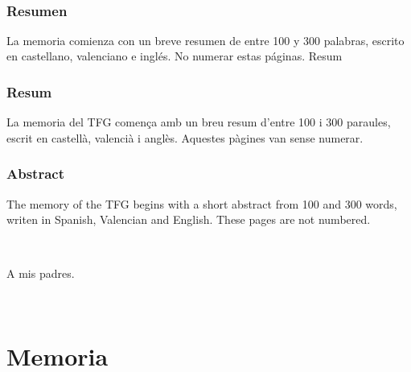 \documentclass[11pt,spanish,a4paper,hidelinks]{book}
\begin{document}
	\renewcommand{\listtablename}{Índice de tablas} 
	\renewcommand{\tablename}{Tabla} 
	\thispagestyle{empty}
	
	\newpage
	\thispagestyle{empty}\ \\
	\newpage
	\thispagestyle{empty}
	
	\section*{Resumen}
	\noindent La memoria comienza con un breve resumen de entre 
	100 y 300
	palabras, escrito en castellano,
	valenciano e inglés. No numerar estas páginas.
	Resum
	
	
	\section*{Resum}
	\noindent La memoria del TFG comença amb un breu resum d’entre 
	100 i 300
	paraules, escrit en castellà, valencià i anglès. Aquestes pàgines van sense numerar.
	
	
	\section*{Abstract}
	\noindent The memory of the TFG begins with a short abstract from 
	100 and 300
	words, writen in Spanish, Valencian and English. These pages are not numbered.
	
	\newpage
	\thispagestyle{empty}
	\ \\
	\vfill\begin{flushright}
		A mis padres.
	\end{flushright}\vfill\vfill
	
	\newpage
	\thispagestyle{empty}
	\ \\
	\tableofcontents\newpage\thispagestyle{empty}
	\listoffigures\thispagestyle{empty}\newpage\thispagestyle{empty}
	\listoftables\thispagestyle{empty}\newpage\thispagestyle{empty}
	\newpage\thispagestyle{empty}
	
	\thispagestyle{empty}
	\setcounter{page}{-2}
	\newpage
	\part{Memoria}
	
\end{document}
